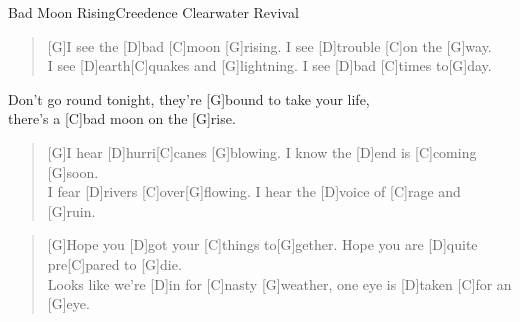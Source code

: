 \begin{song}{Bad Moon Rising}{Creedence Clearwater Revival}

    \begin{verse}  
        [G]I see the [D]bad [C]moon [G]rising. I see [D]trouble [C]on the [G]way. \\
        I see [D]earth[C]quakes and [G]lightning. I see [D]bad [C]times to[G]day.
    \end{verse}  

    \begin{chorus}
        [C]Don't go round tonight, they're [G]bound to take your life, \\
        [D7]there's a [C]bad moon on the [G]rise.
    \end{chorus}

    \begin{verse}  
        [G]I hear [D]hurri[C]canes [G]blowing. I know the [D]end is [C]coming [G]soon. \\
        I fear [D]rivers [C]over[G]flowing. I hear the [D]voice of [C]rage and [G]ruin.
    \end{verse}  


    \begin{verse}  
        [G]Hope you [D]got your [C]things to[G]gether. Hope you are [D]quite pre[C]pared to [G]die.  \\
        Looks like we're [D]in for [C]nasty [G]weather, one eye is [D]taken [C]for an [G]eye.
    \end{verse}  


\end{song}
